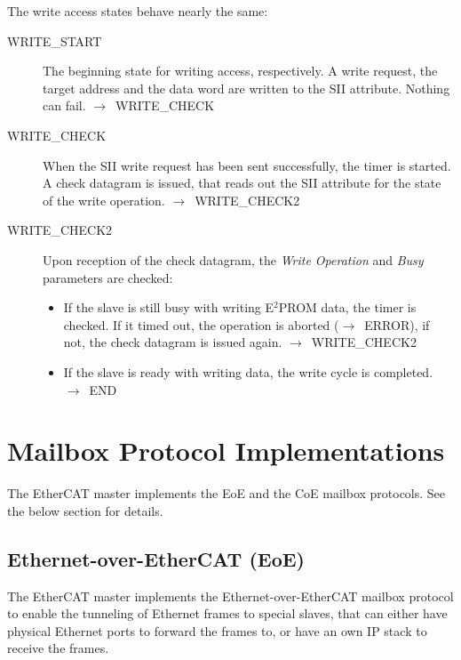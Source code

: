 \documentclass[a4paper,12pt,BCOR6mm,bibtotoc,idxtotoc]{scrbook}
\begin{document}
The write access states behave nearly the same:

\begin{description}
\item[WRITE\_START] The beginning state for writing access,
  respectively. A write request, the target address and the data word
  are written to the SII attribute. Nothing can fail.
  $\rightarrow$~WRITE\_CHECK

\item[WRITE\_CHECK] When the SII write request has been sent
  successfully, the timer is started. A check datagram is issued, that
  reads out the SII attribute for the state of the write operation.
  $\rightarrow$~WRITE\_CHECK2

\item[WRITE\_CHECK2] Upon reception of the check datagram, the
  \textit{Write Operation} and \textit{Busy} parameters are checked:
  \begin{itemize}
  \item If the slave is still busy with writing E$^2$PROM data, the
    timer is checked. If it timed out, the operation is aborted
    ($\rightarrow$~ERROR), if not, the check datagram is issued again.
    $\rightarrow$~WRITE\_CHECK2
  \item If the slave is ready with writing data, the write cycle is
    completed. $\rightarrow$~END
  \end{itemize}
\end{description}


\section{Mailbox Protocol Implementations}

The EtherCAT master implements the EoE and the CoE mailbox
protocols. See the below section for details.


\subsection{Ethernet-over-EtherCAT (EoE)}
\label{sec:eoeimp}

The EtherCAT master implements the Ethernet-over-EtherCAT mailbox
protocol to enable the tunneling of Ethernet frames to special slaves,
that can either have physical Ethernet ports to forward the frames to,
or have an own IP stack to receive the frames.
\end{document}
